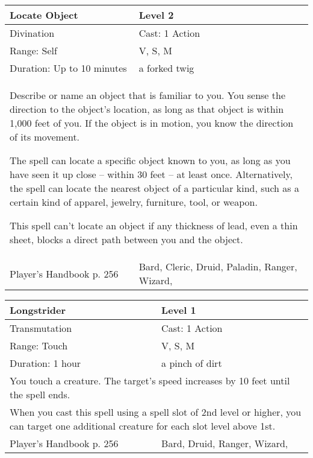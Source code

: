 \documentclass[11pt]{report}
\begin{document}
\begin{table}[H]
	\begin{tabular}{||p{6cm}|p{6cm}||}
		\hline\hline
		\bf{Locate Object} & Level 2\\ \hline
		Divination & Cast: 1 Action\\ \hline
		Range: Self & V, S, M\\ \hline
		Duration: Up to 10 minutes & a forked twig\\ \hline
		\multicolumn{2}{||p{12cm}||}{Describe or name an object that is familiar to you. You sense the direction to the object’s location, as long as that object is within 1,000 feet of you. If the object is in motion, you know the direction of its movement.

The spell can locate a specific object known to you, as long as you have seen it up close – within 30 feet – at least once. Alternatively, the spell can locate the nearest object of a particular kind, such as a certain kind of apparel, jewelry, furniture, tool, or weapon.

This spell can’t locate an object if any thickness of lead, even a thin sheet, blocks a direct path between you and the object.}\\ \hline
Player's Handbook p. 256 & Bard, Cleric, Druid, Paladin, Ranger, Wizard, \\ \hline\hline
	\end{tabular}
\end{table}

\begin{table}[H]
	\begin{tabular}{||p{6cm}|p{6cm}||}
		\hline\hline
		\bf{Longstrider} & Level 1\\ \hline
		Transmutation & Cast: 1 Action\\ \hline
		Range: Touch & V, S, M\\ \hline
		Duration: 1 hour & a pinch of dirt\\ \hline
		\multicolumn{2}{||p{12cm}||}{You touch a creature. The target’s speed increases by 10 feet until the spell ends.}\\ \hline
		\multicolumn{2}{||p{12cm}||}{When you cast this spell using a spell slot of 2nd level or higher, you can target one additional creature for each slot level above 1st.}\\ \hline
Player's Handbook p. 256 & Bard, Druid, Ranger, Wizard, \\ \hline\hline
	\end{tabular}
\end{table}
\end{document}
